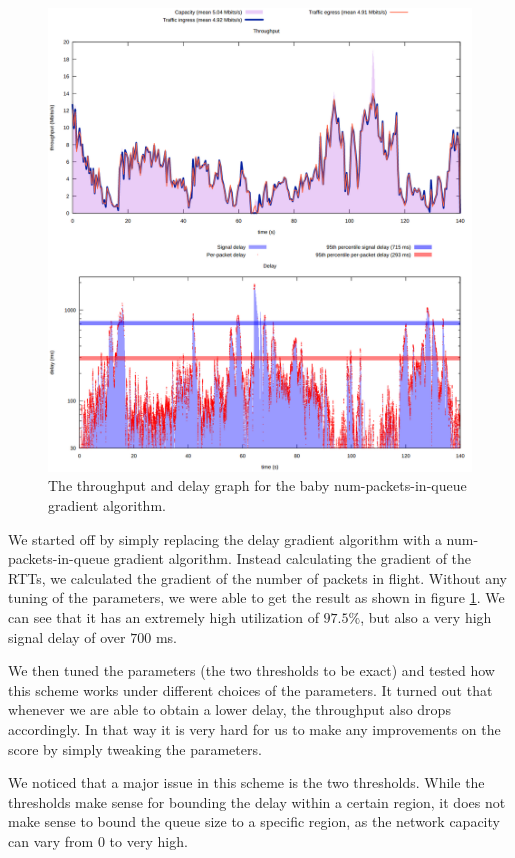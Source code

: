 \documentclass[11pt,a4paper]{article}
\begin{document}
\begin{figure}[h]
  \centering
  \includegraphics[scale=0.4]{contest4}
  \caption{The throughput and delay graph for the baby num-packets-in-queue
  gradient algorithm.}
  \label{fig:cont4}
\end{figure}

We started off by simply replacing the delay gradient algorithm with a
num-packets-in-queue gradient algorithm. Instead calculating the gradient of the
RTTs, we calculated the gradient of the number of packets in flight. Without any
tuning of the parameters, we were able to get the result as shown in figure
\ref{fig:cont4}.  We can see that it has an extremely high utilization of
$97.5\%$, but also a very high signal delay of over $700$ ms.

We then tuned the parameters (the two thresholds to be exact) and tested how
this scheme works under different choices of the parameters. It turned out that
whenever we are able to obtain a lower delay, the throughput also drops
accordingly.  In that way it is very hard for us to make any improvements on the
score by simply tweaking the parameters.

We noticed that a major issue in this scheme is the two thresholds. While the
thresholds make sense for bounding the delay within a certain region, it does
not make sense to bound the queue size to a specific region, as the network
capacity can vary from $0$ to very high.
\end{document}
